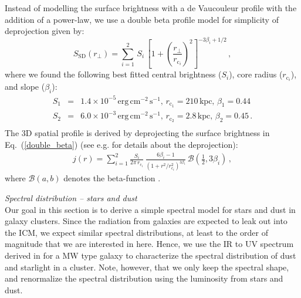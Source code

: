 \documentclass[10pt,aps,pra,reprint,amsmath,amsfonts,amssymb,showpacs]{revtex4-1}
\newcommand{\rmn}{\mathrm}
\newcommand{\sd}{\rmn{SD}}
\begin{document}
Instead of modelling the surface brightness with a de Vaucouleur
profile with the addition of a power-law, we use a double beta profile
model for simplicity of deprojection given by:
\begin{equation}
S_\sd (r_\bot)= \sum_{i=1}^2 \,S_i\, 
\left[1 + \left( \frac{r_\bot}{r_{\mathrm{c}_i}}\right)^2\right]
^{-3\beta_i + 1/2}\,,
\label{double_beta}
\end{equation}
where we found the following best fitted central brightness ($S_i$),
core radius ($r_{\mathrm{c}_i}$), and slope ($\beta_i$):
\begin{eqnarray}
 S_1&=&1.4\times10^{-5}\,\rmn{erg}\,\rmn{cm}^{-2}\,\rmn{s}^{-1},\,
r_{\mathrm{c}_1}=210\,\rmn{kpc},\,
\beta_1=0.44\nonumber\\
 S_2&=&6.0\times10^{-3}\,\rmn{erg}\,\rmn{cm}^{-2}\,\rmn{s}^{-1},\,
r_{\mathrm{c}_2}=2.8\,\rmn{kpc},\,
\beta_2=0.45\,.\nonumber\\
\label{fit_spatial_IR}
\end{eqnarray}
The 3D spatial profile is derived by deprojecting the surface
brightness in Eq.~(\ref{double_beta}) (see
e.g. \cite{2004A&A...413...17P} for details about the deprojection):
\begin{eqnarray}
  j(r)  = \sum_{i=1}^2 \frac{S_i}{2\pi\,r_{\mathrm{c}_i}}\,
  \frac{6 \beta_i - 1}{\left(1 + r^2/r^2_{\mathrm{c}_i}\right)^{3\beta_i}}\,
  \mathcal{B}\left(\frac{1}{2},3\beta_i\right)\,,
\end{eqnarray}
where $\mathcal{B}(a,b)$ denotes the beta-function
\cite{1965hmfw.book.....A}.

{\it Spectral distribution -- stars and dust} \\ Our goal in this
section is to derive a simple spectral model for stars and dust in
galaxy clusters. Since the radiation from galaxies are expected to
leak out into the ICM, we expect similar spectral distributions, at
least to the order of magnitude that we are interested in here. Hence, we
use the IR to UV spectrum derived in \cite{2006ApJ...648L..29P} for a
MW type galaxy to characterize the spectral distribution of dust and
starlight in a cluster. Note, however, that we only keep the spectral
shape, and renormalize the spectral distribution using the luminosity
from stars and dust.
\end{document}
